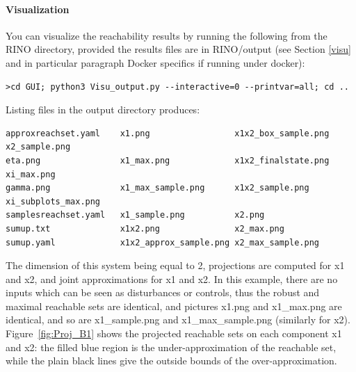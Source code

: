 \documentclass{article}
\begin{document}
\paragraph{Visualization}
You can visualize the  reachability results by running the following  from the RINO directory, provided the results files are in RINO/output (see Section \ref{visu} and in particular paragraph Docker specifics if running under docker):
\begin{verbatim}
>cd GUI; python3 Visu_output.py --interactive=0 --printvar=all; cd ..
\end{verbatim}
Listing files in the output directory produces:
\small
\begin{verbatim}
approxreachset.yaml    x1.png                 x1x2_box_sample.png    x2_sample.png
eta.png                x1_max.png             x1x2_finalstate.png    xi_max.png
gamma.png              x1_max_sample.png      x1x2_sample.png        xi_subplots_max.png
samplesreachset.yaml   x1_sample.png          x2.png
sumup.txt              x1x2.png               x2_max.png
sumup.yaml             x1x2_approx_sample.png x2_max_sample.png

\end{verbatim}
\normalsize
The dimension of this system being equal to 2,  projections are computed for x1 and x2, and joint approximations for x1 and x2. 
In this example,   there are no inputs which can be seen as disturbances or controls,  thus the robust and maximal reachable sets are identical, and pictures x1.png  and x1\_max.png are identical, and so are x1\_sample.png  and x1\_max\_sample.png (similarly for x2).  Figure~\ref{fig:Proj_B1} shows the projected reachable sets on each component x1 and x2: the filled blue region is the under-approximation of the reachable set, while the plain black lines give the outside bounds of the over-approximation. 
\end{document}
